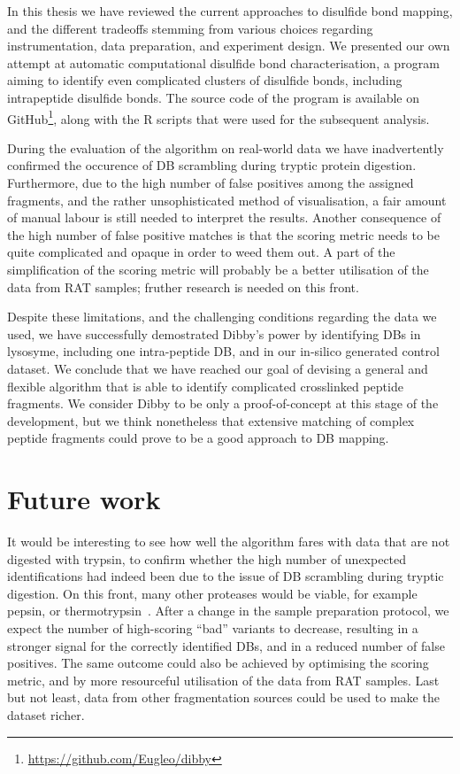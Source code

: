 
In this thesis we have reviewed the current approaches to disulfide bond mapping, and the different tradeoffs stemming from various choices regarding instrumentation, data preparation, and experiment design. We presented our own attempt at automatic computational disulfide bond characterisation, a program aiming to identify even complicated clusters of disulfide bonds, including intrapeptide disulfide bonds. The source code of the program is available on GitHub\footnote{\url{https://github.com/Eugleo/dibby}}, along with the R scripts that were used for the subsequent analysis.

During the evaluation of the algorithm on real-world data we have inadvertently confirmed the occurence of DB scrambling during tryptic protein digestion. Furthermore, due to the high number of false positives among the assigned fragments, and the rather unsophisticated method of visualisation, a fair amount of manual labour is still needed to interpret the results. Another consequence of the high number of false positive matches is that the scoring metric needs to be quite complicated and opaque in order to weed them out. A part of the simplification of the scoring metric will probably be a better utilisation of the data from RAT samples; fruther research is needed on this front.

Despite these limitations, and the challenging conditions regarding the data we used, we have successfully demostrated Dibby's power by identifying DBs in lysosyme, including one intra-peptide DB, and in our in-silico generated control dataset. We conclude that we have reached our goal of devising a general and flexible algorithm that is able to identify complicated crosslinked peptide fragments. We consider Dibby to be only a proof-of-concept at this stage of the development, but we think nonetheless that extensive matching of complex peptide fragments could prove to be a good approach to DB mapping.

\section*{Future work}

It would be interesting to see how well the algorithm fares with data that are not digested with trypsin, to confirm whether the high number of unexpected identifications had indeed been due to the issue of DB scrambling during tryptic digestion. On this front, many other proteases would be viable, for example pepsin, or thermotrypsin~\cite{sung2016evaluation}. After a change in the sample preparation protocol, we expect the number of high-scoring ``bad'' variants to decrease, resulting in a stronger signal for the correctly identified DBs, and in a reduced number of false positives. The same outcome could also be achieved by optimising the scoring metric, and by more resourceful utilisation of the data from RAT samples. Last but not least, data from other fragmentation sources could be used to make the dataset richer.

